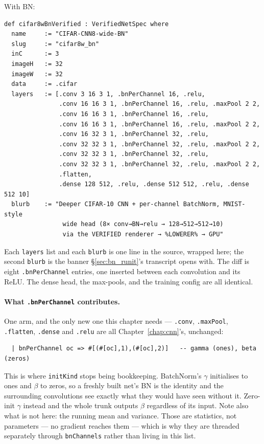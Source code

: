 With BN:

\begin{verbatim}
def cifar8wBnVerified : VerifiedNetSpec where
  name     := "CIFAR-CNN8-wide-BN"
  slug     := "cifar8w_bn"
  inC      := 3
  imageH   := 32
  imageW   := 32
  data     := .cifar
  layers   := [.conv 3 16 3 1, .bnPerChannel 16, .relu,
               .conv 16 16 3 1, .bnPerChannel 16, .relu, .maxPool 2 2,
               .conv 16 16 3 1, .bnPerChannel 16, .relu,
               .conv 16 16 3 1, .bnPerChannel 16, .relu, .maxPool 2 2,
               .conv 16 32 3 1, .bnPerChannel 32, .relu,
               .conv 32 32 3 1, .bnPerChannel 32, .relu, .maxPool 2 2,
               .conv 32 32 3 1, .bnPerChannel 32, .relu,
               .conv 32 32 3 1, .bnPerChannel 32, .relu, .maxPool 2 2,
               .flatten,
               .dense 128 512, .relu, .dense 512 512, .relu, .dense 512 10]
  blurb    := "Deeper CIFAR-10 CNN + per-channel BatchNorm, MNIST-style
                wide head (8× conv→BN→relu → 128→512→512→10)
                via the VERIFIED renderer → %LOWERER% → GPU"
\end{verbatim}

Each \texttt{layers} list and each \texttt{blurb} is one line in the
source, wrapped here; the second \texttt{blurb} is the banner
\S\ref{sec:bn_runit}'s transcript opens with. The diff is eight
\texttt{.bnPerChannel} entries, one inserted between
each convolution and its ReLU. The dense head, the max-pools, and the
training config are all identical.

\paragraph{What \texttt{.bnPerChannel} contributes.} One arm, and the
only new one this chapter needs --- \texttt{.conv}, \texttt{.maxPool},
\texttt{.flatten}, \texttt{.dense} and \texttt{.relu} are all
Chapter~\ref{chap:cnn}'s, unchanged:

\begin{verbatim}
  | bnPerChannel oc => #[(#[oc],1),(#[oc],2)]   -- gamma (ones), beta (zeros)
\end{verbatim}

\noindent This is where \texttt{initKind} stops being bookkeeping.
BatchNorm's $\gamma$ initialises to ones and $\beta$ to zeros, so
a freshly built net's BN is the identity and the surrounding
convolutions see exactly what they would have seen without it. Zero-init
$\gamma$ instead and the whole trunk outputs $\beta$ regardless of its
input. Note also what is not here: the running mean and variance.
Those are statistics, not parameters --- no gradient reaches them --- which
is why they are threaded separately through \texttt{bnChannels} rather
than living in this list.

